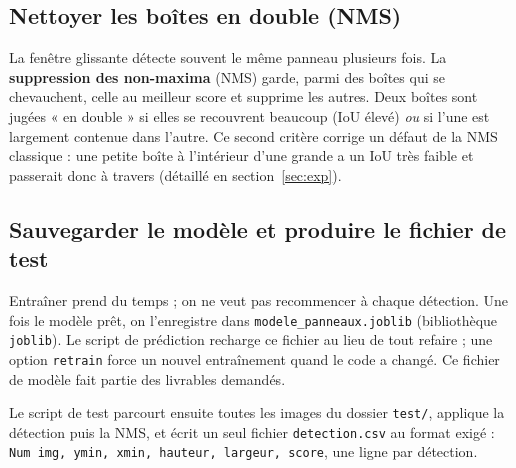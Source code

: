 \documentclass[a4paper,10pt]{article}
\begin{document}
\subsection{Nettoyer les boîtes en double (NMS)}
\label{sec:nms}
La fenêtre glissante détecte souvent le même panneau plusieurs fois. La
\textbf{suppression des non-maxima} (NMS) garde, parmi des boîtes qui se chevauchent,
celle au meilleur score et supprime les autres. Deux boîtes sont jugées « en double »
si elles se recouvrent beaucoup (IoU élevé) \emph{ou} si l'une est largement contenue
dans l'autre. Ce second critère corrige un défaut de la NMS classique : une petite
boîte à l'intérieur d'une grande a un IoU très faible et passerait donc à travers
(détaillé en section~\ref{sec:exp}).

\subsection{Sauvegarder le modèle et produire le fichier de test}
Entraîner prend du temps ; on ne veut pas recommencer à chaque détection. Une fois le
modèle prêt, on l'enregistre dans \texttt{modele\_panneaux.joblib} (bibliothèque
\texttt{joblib}). Le script de prédiction recharge ce fichier au lieu de tout refaire ;
une option \texttt{retrain} force un nouvel entraînement quand le code a changé. Ce
fichier de modèle fait partie des livrables demandés.

Le script de test parcourt ensuite toutes les images du dossier \texttt{test/},
applique la détection puis la NMS, et écrit un seul fichier \texttt{detection.csv} au
format exigé : \texttt{Num img, ymin, xmin, hauteur, largeur, score}, une ligne par
détection.
\end{document}
